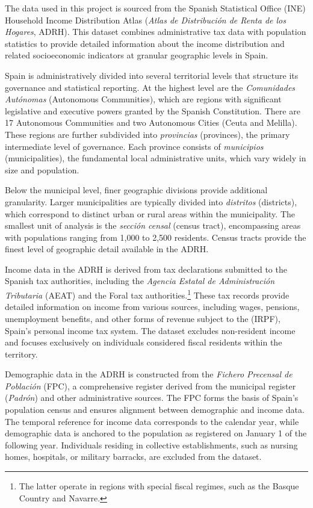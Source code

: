 
The data used in this project is sourced from the Spanish Statistical Office (INE) Household Income Distribution Atlas (\textit{Atlas de Distribución de Renta de los Hogares}, ADRH). This dataset combines administrative tax data with population statistics to provide detailed information about the income distribution and related socioeconomic indicators at granular geographic levels in Spain.

Spain is administratively divided into several territorial levels that structure its governance and statistical reporting. At the highest level are the \textit{Comunidades Autónomas} (Autonomous Communities), which are regions with significant legislative and executive powers granted by the Spanish Constitution. There are 17 Autonomous Communities and two Autonomous Cities (Ceuta and Melilla). These regions are further subdivided into \textit{provincias} (provinces), the primary intermediate level of governance. Each province consists of \textit{municipios} (municipalities), the fundamental local administrative units, which vary widely in size and population.

Below the municipal level, finer geographic divisions provide additional granularity. Larger municipalities are typically divided into \textit{distritos} (districts), which correspond to distinct urban or rural areas within the municipality. The smallest unit of analysis is the \textit{sección censal} (census tract), encompassing areas with populations ranging from 1,000 to 2,500 residents. Census tracts provide the finest level of geographic detail available in the ADRH.

Income data in the ADRH is derived from tax declarations submitted to the Spanish tax authorities, including the \textit{Agencia Estatal de Administración Tributaria} (AEAT) and the Foral tax authorities.\footnote{The latter operate in regions with special fiscal regimes, such as the Basque Country and Navarre.} These tax records provide detailed information on income from various sources, including wages, pensions, unemployment benefits, and other forms of revenue subject to the  (IRPF), Spain's personal income tax system. The dataset excludes non-resident income and focuses exclusively on individuals considered fiscal residents within the territory.

Demographic data in the ADRH is constructed from the \textit{Fichero Precensal de Población} (FPC), a comprehensive register derived from the municipal register (\textit{Padrón}) and other administrative sources. The FPC forms the basis of Spain’s population census and ensures alignment between demographic and income data. The temporal reference for income data corresponds to the calendar year, while demographic data is anchored to the population as registered on January 1 of the following year. Individuals residing in collective establishments, such as nursing homes, hospitals, or military barracks, are excluded from the dataset.
